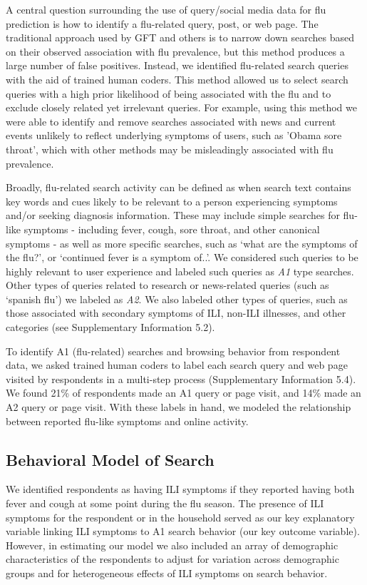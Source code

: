 \documentclass[fleqn,10pt]{wlscirep}
\begin{document}
A central question surrounding the use of query/social media data for flu prediction is how to identify a flu-related query, post, or web page. The traditional approach used by GFT and others is to narrow down searches based on their observed association with flu prevalence, but this method produces a large number of false positives. Instead, we identified flu-related search queries with the aid of trained human coders. This method allowed us to select search queries with a high prior likelihood of being associated with the flu and to exclude closely related yet irrelevant queries. For example, using this method we were able to identify and remove searches associated with news and current events unlikely to reflect underlying symptoms of users, such as 'Obama sore throat', which with other methods may be misleadingly associated with flu prevalence. 

Broadly, flu-related search activity can be defined as when search text contains key words and cues likely to be relevant to a person experiencing symptoms and/or seeking diagnosis information. These may include simple searches for flu-like symptoms - including fever, cough, sore throat, and other canonical symptoms - as well as more specific searches, such as `what are the symptoms of the flu?', or `continued fever is a symptom of..'. We considered such queries to be highly relevant to user experience and labeled such queries as \emph{A1} type searches. Other types of queries related to research or news-related queries (such as `spanish flu') we labeled as \emph{A2}. We also labeled other types of queries, such as those associated with secondary symptoms of ILI, non-ILI illnesses, and other categories (see Supplementary Information 5.2). 

To identify A1 (flu-related) searches and browsing behavior from respondent data, we asked trained human coders to label each search query and web page visited by respondents in a multi-step process (Supplementary Information 5.4). We found 21\% of respondents made an A1 query or page visit, and 14\% made an A2 query or page visit. With these labels in hand, we modeled the relationship between reported flu-like symptoms and online activity.

\subsection*{Behavioral Model of Search}

We identified respondents as having ILI symptoms if they reported having both fever and cough at some point during the flu season. The presence of ILI symptoms for the respondent or in the household served as our key explanatory variable linking ILI symptoms to A1 search behavior (our key outcome variable). However, in estimating our model we also included an array of demographic characteristics of the respondents to adjust for variation across demographic groups and for heterogeneous effects of ILI symptoms on search behavior.
\end{document}
